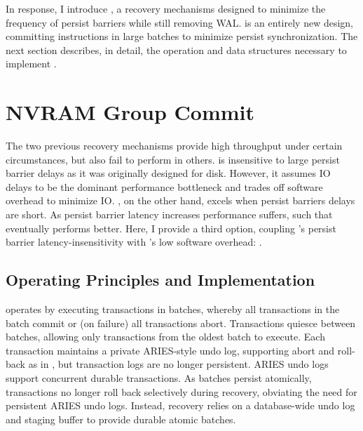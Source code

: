 In response, I introduce \GroupCommit, a recovery mechanisms designed to minimize the frequency of persist barriers while still removing WAL.
\GroupCommit is an entirely new design, committing instructions in large batches to minimize persist synchronization.
The next section describes, in detail, the operation and data structures necessary to implement \GroupCommit.

\section{NVRAM Group Commit}
\label{sec:OLTP_design:GroupCommit}

The two previous recovery mechanisms provide high throughput under certain circumstances, but also fail to perform in others.
\NVDisk is insensitive to large persist barrier delays as it was originally designed for disk.
However, it assumes IO delays to be the dominant performance bottleneck and trades off software overhead to minimize IO.
\InPlace, on the other hand, excels when persist barriers delays are short.
As persist barrier latency increases performance suffers, such that \NVDisk eventually performs better.
Here, I provide a third option, coupling \NVDisk's persist barrier latency-insensitivity with \InPlace's low software overhead: \GroupCommit.

\subsection{Operating Principles and Implementation}
\label{sec:OLTP_design:GroupCommit:Proposed}

\GroupCommit operates by executing transactions in batches, whereby all transactions in the batch commit or (on failure) all transactions abort.
Transactions quiesce between batches, allowing only transactions from the oldest batch to execute.
Each transaction maintains a private ARIES-style undo log, supporting abort and roll-back as in \InPlace, but transaction logs are no longer persistent.
ARIES undo logs support concurrent durable transactions.
As batches persist atomically, transactions no longer roll back selectively during recovery, obviating the need for persistent ARIES undo logs.
Instead, recovery relies on a database-wide undo log and staging buffer to provide durable atomic batches.

